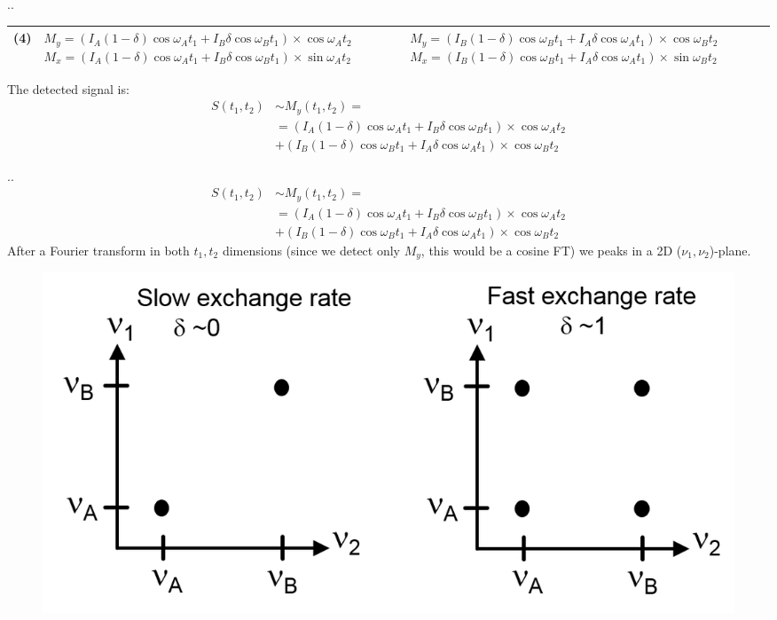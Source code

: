\documentclass{beamer}
\begin{document}
\begin{frame}{\thesection.\thesubsection. \insertsubsection}
{\begin{table}[ht]
\begin{tabular}{  C{0.2cm}  L{5.0cm}  L{5.5cm} }
            (4) &  $M_y = (I_A (1- \delta) \cos \omega_A t_1 + I_B \delta \cos \omega_B t_1) \times \cos \omega_A t_2$  \newline 
             $M_x = (I_A (1- \delta) \cos \omega_A t_1 + I_B \delta \cos \omega_B t_1) \times \sin \omega_A t_2$            
            &
            $M_y = (I_B (1- \delta) \cos \omega_B t_1 + I_A \delta \cos \omega_A t_1) \times \cos \omega_B t_2$  \newline 
            $M_x = (I_B (1- \delta) \cos \omega_B t_1 + I_A \delta \cos \omega_A t_1) \times \sin \omega_B t_2$            
            \\ \hline         
			\hline
		\end{tabular}	     	     
		\label{tab: 2D exchange}		
	\end{table}
  }   

\normalsize{
The detected signal is:
\begin{align*}
  S(t_1,t_2) &\sim M_y(t_1,t_2)  = \\
   &=(I_A (1- \delta) \cos \omega_A t_1 + I_B \delta \cos \omega_B t_1) \times \cos \omega_A t_2 \\
   &+ (I_B (1- \delta) \cos \omega_B t_1 + I_A \delta \cos \omega_A t_1) \times \cos \omega_B t_2  
\end{align*}
}
\end{frame}

\begin{frame}{\thesection.\thesubsection. \insertsubsection}
	\begin{align*}
	S(t_1,t_2) &\sim M_y(t_1,t_2)  = \\
	&=(I_A (1- \delta) \cos \omega_A t_1 + I_B \delta \cos \omega_B t_1) \times \cos \omega_A t_2 \\
	&+ (I_B (1- \delta) \cos \omega_B t_1 + I_A \delta \cos \omega_A t_1) \times \cos \omega_B t_2  
	\end{align*}
  After a Fourier transform in both $t_1,t_2$ dimensions (since we detect only $M_y$, this would be a cosine FT) we peaks in a 2D ($\nu_1,\nu_2$)-plane.  
  \begin{figure}
  	\centering
  	\includegraphics[scale=0.5]{figures/2D_exchange.png}
  \end{figure}  
\end{frame}
\end{document}
